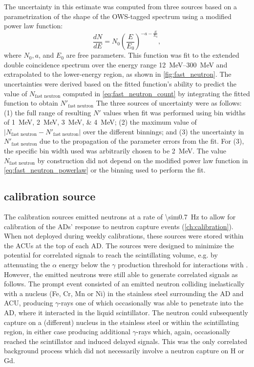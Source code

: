 The uncertainty in this estimate was computed from three sources
based on a parametri\-zation of the shape of the OWS-tagged spectrum
using a modified power law function:
\begin{equation}\label{eq:fast_neutron_powerlaw}
    \frac{dN}{dE} = N_0 \left(\frac{E}{E_0}\right)^{-a-\frac{E}{E_0}},
\end{equation}
where $N_0,a$, and $E_0$ are free parameters.
This function was fit to the extended double coincidence spectrum
over the energy range \SIrange{12}{300}{\MeV}
and extrapolated to the lower-energy region,
as shown in \cref{fig:fast_neutron}.
The uncertainties were derived based on the fitted function's
ability to predict the value of $N_{\text{fast neutron}}$
computed in \cref{eq:fast_neutron_count}
by integrating the fitted function to obtain $N'_\text{fast neutron}$
The three sources of uncertainty were as follows:
(1) the full range of resulting $N'$ values
when fit was performed using bin widths of \SIlist{1;2;3;4}{\MeV};
(2) the maximum value of $\vert N_\text{fast neutron} - N'_\text{fast neutron}\vert$
over the different binnings;
and (3) the uncertainty in $N'_\text{fast neutron}$ due to
the propagation of the parameter errors from the fit.
For (3), the specific bin width used was arbitrarily chosen to be \SI{2}{\MeV}.
The value $N_\text{fast neutron}$ by construction did not depend
on the modified power law function in \cref{eq:fast_neutron_powerlaw}
or the binning used to perform the fit.

\subsection{\texorpdfstring{\amcbold}{Am-C} calibration source}
\label{subsec:amc}

The \amc{} calibration sources emitted neutrons at a rate of \SI{\sim0.7}{\Hz}
to allow for calibration of the ADs' response to neutron capture events
(\cref{ch:calibration}).
When not deployed during weekly calibrations, these sources
were stored within the ACUs at the top of each AD.
The sources were designed to minimize
the potential for correlated signals to reach the scintillating volume,
e.g. by attenuating the $\alpha$ energy below the $\gamma$ production
threshold for interactions with  \cite{ngd2016}.
However, the emitted neutrons were still able to generate
correlated signals as follows.
The prompt event consisted of an emitted neutron colliding inelastically
with a nucleus (Fe, Cr, Mn or Ni) in the stainless steel surrounding the AD and ACU,
producing $\gamma$-rays one of which occasionally was able to penetrate
into the AD, where it interacted in the liquid scintillator.
The neutron could subsequently capture on a (different) nucleus
in the stainless steel or within the scintillating region,
in either case producing additional $\gamma$-rays
which, again, occasionally reached the scintillator and induced delayed signals.
This was the only correlated background process
which did not necessarily involve a neutron capture on H or Gd.

